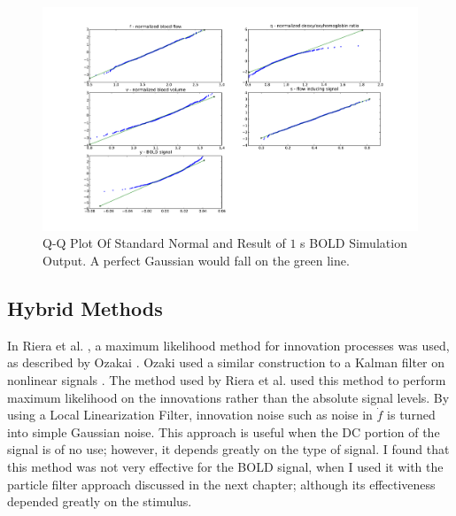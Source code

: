\begin{figure}
\includegraphics[trim=6cm .75cm 6cm .75cm,width=16cm]{images/gauss_step_1sec_3sigma.pdf}
\caption[Q-Q Plot Of Standard Normal and Result of $1$ s BOLD Simulation Output]
{Q-Q Plot Of Standard Normal and Result of $1$ s BOLD Simulation Output. A
perfect Gaussian would fall on the green line.}
\label{fig:trans1s}
\end{figure}

\subsection{Hybrid Methods}
In Riera et al. \cite{Riera2003}, a maximum
likelihood method for innovation processes was used, as described by
Ozakai \cite{Ozaki1994}. Ozaki \cite{Ozaki1994} used a similar construction to a 
Kalman filter on nonlinear signals \cite{Ozaki1994}. 
The method used by Riera et al.\cite{Riera2003} used this method to 
perform maximum likelihood on
the innovations rather than the absolute signal levels. 
By using a Local Linearization Filter,
innovation noise such as noise in $\dot{f}$ is turned into simple 
Gaussian noise. This approach is useful when the \ac{DC} portion of the signal is
of no use; however, it depends greatly on the type of signal. I found that
this method was not very effective for the \ac{BOLD} signal, when I used it 
with the particle filter approach discussed in the next chapter; although its
effectiveness depended greatly on the stimulus.

